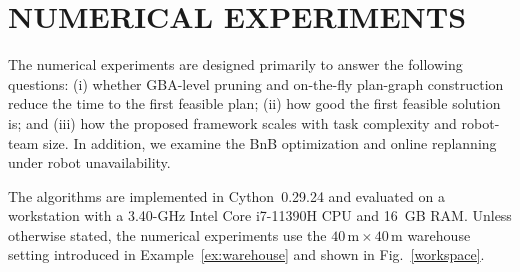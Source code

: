 \documentclass[lettersize,journal]{IEEEtran}
\theoremstyle{italiclemma}
\theoremstyle{italiclemma}
\theoremstyle{definition}
\begin{document}
\section{NUMERICAL EXPERIMENTS}
\label{sec:numerical_experiments}
The numerical experiments are designed primarily to answer the following questions: (i) whether GBA-level pruning and on-the-fly plan-graph construction reduce the time to the first feasible plan; (ii) how good the first feasible solution is; and (iii) how the proposed framework scales with task complexity and robot-team size. In addition, we examine the BnB optimization and online replanning under robot unavailability.


The algorithms are implemented in Cython~0.29.24 and evaluated on a workstation with a 3.40-GHz Intel Core i7-11390H CPU and 16~GB RAM. Unless otherwise stated, the numerical experiments use the $40\,\mathrm{m}\times40\,\mathrm{m}$ warehouse setting introduced in
Example~\ref{ex:warehouse} and shown in Fig.~\ref{workspace}.

\end{document}
